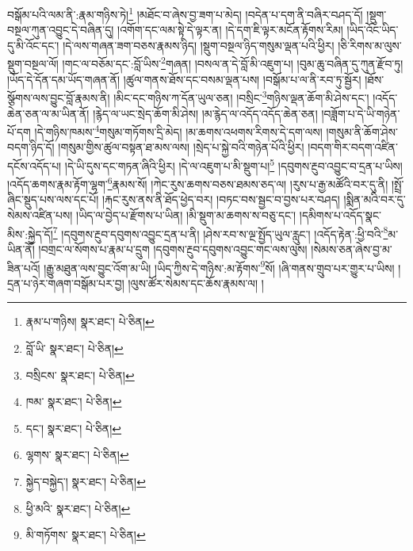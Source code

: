 བསྒོམ་པའི་ལམ་ནི་:རྣམ་གཉིས་ཏེ།\footnote{རྣམ་པ་གཉིས།  སྣར་ཐང་།  པེ་ཅིན། } །མཐོང་བ་ཞེས་བྱ་ཟག་པ་མེད། །བདེན་པ་དག་ནི་བཞིར་བཤད་དོ། །སྡུག་བསྔལ་ཀུན་འབྱུང་དེ་བཞིན་དུ། །འགོག་དང་ལམ་སྟེ་དེ་ལྟར་ན། །དེ་དག་ཇི་ལྟར་མངོན་རྟོགས་རིམ། །ཡིད་འོང་ཡིད་དུ་མི་འོང་དང་། །དེ་ལས་གཞན་ཟག་བཅས་རྣམས་ཉིད། །སྡུག་བསྔལ་ཉིད་གསུམ་ལྡན་པའི་ཕྱིར། །ཅི་རིགས་མ་ལུས་སྡུག་བསྔལ་ལོ། །གང་ལ་བཅོམ་དང་:བློ་ཡིས་\footnote{བློ་ཡི་  སྣར་ཐང་།  པེ་ཅིན། }གཞན། །བསལ་ན་དེ་བློ་མི་འཇུག་པ། །བུམ་ཆུ་བཞིན་དུ་ཀུན་རྫོབ་ཏུ། །ཡོད་དེ་དོན་དམ་ཡོད་གཞན་ནོ། །ཚུལ་གནས་ཐོས་དང་བསམ་ལྡན་པས། །བསྒོམ་པ་ལ་ནི་རབ་ཏུ་སྦྱོར། །ཐོས་སྩོགས་ལས་བྱུང་བློ་རྣམས་ནི། །མིང་དང་གཉིས་ཀ་དོན་ཡུལ་ཅན། །བསྲིང་\footnote{བསྲིངས་  སྣར་ཐང་།  པེ་ཅིན། }གཉིས་ལྡན་ཆོག་མི་ཤེས་དང་། །འདོད་ཆེན་ཅན་ལ་མ་ཡིན་ནོ། །རྙེད་ལ་ཡང་སྲེད་ཆོག་མི་ཤེས། །མ་རྙེད་ལ་འདོད་འདོད་ཆེན་ཅན། །བཟློག་པ་དེ་ཡི་གཉེན་པོ་དག །དེ་གཉིས་ཁམས་\footnote{ཁམ་  སྣར་ཐང་།  པེ་ཅིན། }གསུམ་གཏོགས་དྲི་མེད། །མ་ཆགས་འཕགས་རིགས་དེ་དག་ལས། །གསུམ་ནི་ཆོག་ཤེས་བདག་ཉིད་དོ། །གསུམ་གྱིས་ཚུལ་བསྟན་ཐ་མས་ལས། །སྲེད་པ་སྐྱེ་བའི་གཉེན་པོའི་ཕྱིར། །བདག་གིར་བདག་འཛིན་དངོས་འདོད་པ། །དེ་ཡི་དུས་དང་གཏན་ཞིའི་ཕྱིར། །དེ་ལ་འཇུག་པ་མི་སྡུག་པ།\footnote{དང་།  སྣར་ཐང་།  པེ་ཅིན། } །དབུགས་རྔུབ་འབྱུང་བ་དྲན་པ་ཡིས། །འདོད་ཆགས་རྣམ་རྟོག་ལྷག་\footnote{ལྷགས་  སྣར་ཐང་།  པེ་ཅིན། }རྣམས་སོ། །ཀེང་རུས་ཆགས་བཅས་ཐམས་ཅད་ལ། །རུས་པ་རྒྱ་མཚོའི་བར་དུ་ནི། །སྤྲོ་ཞིང་སྡུད་པས་ལས་དང་པོ། །རྐང་རུས་ནས་ནི་ཐོད་ཕྱེད་བར། །བཏང་བས་སྦྱང་བ་བྱས་པར་བཤད། །སྨིན་མའི་བར་དུ་སེམས་འཛིན་པས། །ཡིད་ལ་བྱེད་པ་རྫོགས་པ་ཡིན། །མི་སྡུག་མ་ཆགས་ས་བཅུ་དང་། །དམིགས་པ་འདོད་སྣང་མིས་:སྐྱེད་དོ།\footnote{སྐྱེད་བསྐྱེད་།  སྣར་ཐང་།  པེ་ཅིན། } །དབུགས་རྔུབ་དབུགས་འབྱུང་དྲན་པ་ནི། །ཤེས་རབ་ས་ལྔ་སྤྱོད་ཡུལ་རླུང་། །འདོད་རྟེན་:ཕྱི་བའི་\footnote{ཕྱི་མའི་  སྣར་ཐང་།  པེ་ཅིན། }མ་ཡིན་ནོ། །བགྲང་ལ་སོགས་པ་རྣམ་པ་དྲུག །དབུགས་རྔུབ་དབུགས་འབྱུང་གང་ལས་ལུས། །སེམས་ཅན་ཞེས་བྱ་མ་ཟིན་པའོ། །རྒྱུ་མཐུན་ལས་བྱུང་འོག་མ་ཡི། །ཡིད་ཀྱིས་དེ་གཉིས་:མ་རྟོགས་\footnote{མི་གཏོགས་  སྣར་ཐང་།  པེ་ཅིན། }སོ། །ཞི་གནས་གྲུབ་པར་གྱུར་པ་ཡིས། །དྲན་པ་ཉེར་གཞག་བསྒོམ་པར་བྱ། །ལུས་ཚོར་སེམས་དང་ཆོས་རྣམས་ལ། །
